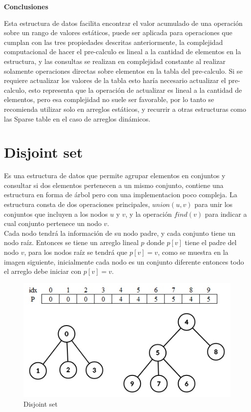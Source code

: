 \documentclass[12pt, a4paper]{article}
\newcommand{\subtitulo}[1]{\begin{center}\textbf{#1}\end{center}}
\begin{document}
	\subtitulo{Conclusiones}
	Esta estructura de datos facilita encontrar el valor acumulado de una operación sobre un rango de valores 
	estáticos, puede ser aplicada para operaciones que cumplan con las tres propiedades descritas
	anteriormente, la complejidad computacional de hacer el pre-calculo es lineal a la cantidad de
	elementos en la estructura, y las consultas se realizan en complejidad constante al realizar solamente operaciones
	directas sobre elementos en la tabla del pre-calculo. Si se requiere actualizar los valores de la tabla esto
	haría necesario actualizar el pre-calculo, esto representa que la operación de actualizar es lineal a la 
	cantidad de elementos, pero esa complejidad no suele ser favorable, por lo tanto se recomienda utilizar solo 
	en arreglos estáticos, y recurrir a otras estructuras como las Sparse table en el caso de arreglos dinámicos.
	
	\section{Disjoint set}
	\label{estructuras:disjoint_set}
	
	Es una estructura de datos que permite agrupar elementos en conjuntos y consultar si dos elementos
	pertenecen a un mismo conjunto, contiene una estructura en forma de árbol pero con una implementacion poco
	compleja. La estructura consta de dos operaciones principales, $union(u, v)$ para unir los conjuntos que incluyen 
	a los nodos $u$ y $v$, y la operación $find(v)$ para indicar a cual conjunto pertenece un nodo $v$.\\
	
	Cada nodo tendrá la información de su nodo padre, y cada conjunto tiene un nodo raíz. Entonces se tiene un 
	arreglo lineal $p$ donde $p[v]$ tiene el padre del nodo $v$, para los nodos raíz se tendrá que $p[v]=v$, 
	como se muestra en la imagen siguiente, inicialmente cada nodo es un conjunto diferente entonces todo el arreglo 
	debe iniciar con $p[v]=v$.
	
	\begin{figure}[h!]
		\centering
		\includegraphics[scale=0.7]{Estructuras_de_datos/imagenes/disjoint_set/construccion}
		\caption{Disjoint set}
		\label{estructuras:disjoint_set:construccion}
	\end{figure}
	
\end{document}
